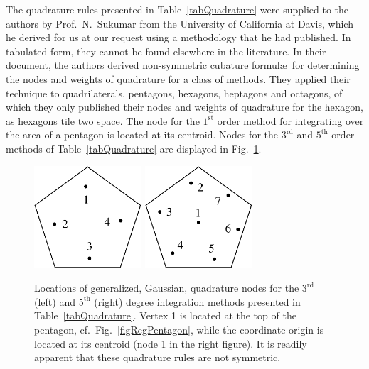 The quadrature rules presented in Table~\ref{tabQuadrature} were supplied to the authors by Prof.\ N.\ Sukumar from the University of California at Davis, which he derived for us at our request using a methodology that he had published. \cite{Mousavietal10}  In tabulated form, they cannot be found elsewhere in the literature.  In their document, the authors derived non-symmetric cubature formul\ae\ for determining the nodes and weights of quadrature for a class of methods.  They applied their technique to quadrilaterals, pentagons, hexagons, heptagons and octagons, of which they only published their nodes and weights of quadrature for the hexagon, as hexagons tile two space.  The node for the $1^{\mathrm{st}}$ order method for integrating over the area of a pentagon is located at its centroid.  Nodes for the $3^{\mathrm{rd}}$ and $5^{\mathrm{th}}$ order methods of Table~\ref{tabQuadrature} are displayed in Fig.~\ref{figQuadrature}.

\begin{figure}
    \centering
    \includegraphics[width=4cm]{figures/pentagon_degree3.pdf}
    \hspace{1cm}
    \includegraphics[width=4cm]{figures/pentagon_degree5.pdf}
    \caption{Locations of generalized, Gaussian, quadrature nodes for the $3^{\mathrm{rd}}$ (left) and $5^{\mathrm{th}}$ (right) degree integration methods presented in Table~\ref{tabQuadrature}.  Vertex 1 is located at the top of the pentagon, cf.\ Fig.~\ref{figRegPentagon}, while the coordinate origin is located at its centroid (node 1 in the right figure).  It is readily apparent that these quadrature rules are not symmetric.}
    \label{figQuadrature}
\end{figure}

